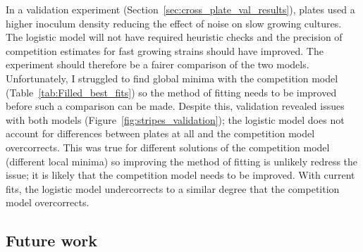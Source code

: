 In a validation experiment
(Section~\ref{sec:cross_plate_val_results}), plates used a higher
inoculum density reducing the effect of noise on slow growing
cultures. The logistic model will not have required heuristic checks
and the precision of competition estimates for fast growing strains
should have improved. The experiment should therefore be a fairer
comparison of the two models. Unfortunately, I struggled to find
global minima with the competition model
(Table~\ref{tab:Filled_best_fits}) so the method of fitting needs to
be improved before such a comparison can be made. Despite this,
validation revealed issues with both models
(Figure~\ref{fig:stripes_validation}); the logistic model does not
account for differences between plates at all and the competition
model overcorrects. This was true for different solutions of the
competition model (different local minima) so improving the method of
fitting is unlikely redress the issue; it is likely that the
competition model needs to be improved. With current fits, the
logistic model undercorrects to a similar degree that the competition
model overcorrects.





\subsection{Future work}

